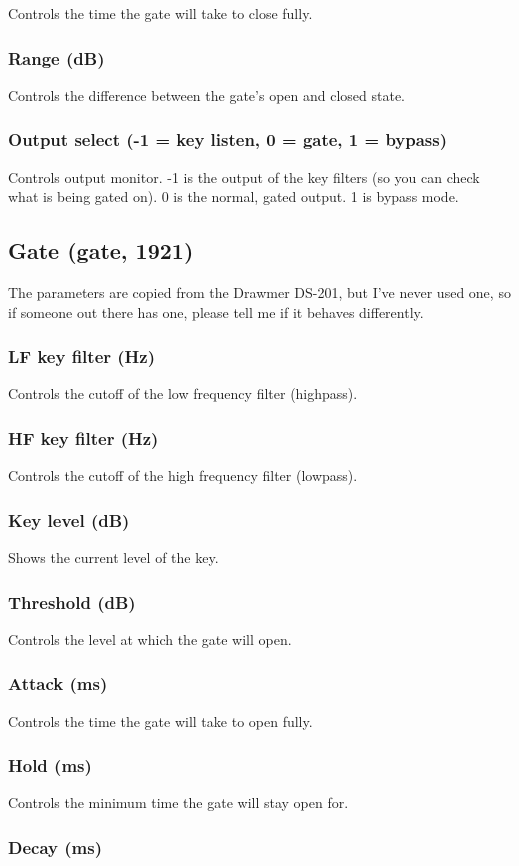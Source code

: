 \documentclass[11pt]{article}
\begin{document}
Controls the time the gate will take to close fully.\subsubsection*{Range (dB)}
Controls the difference between the gate's open and closed state.\subsubsection*{Output select (-1 = key listen, 0 = gate, 1 = bypass)}
Controls output monitor. -1 is the output of the key filters (so you can check what is being gated on). 0 is the normal, gated output. 1 is bypass mode.\subsection{Gate (gate, 1921)\label{gate}\label{id1921}}
The parameters are copied from the Drawmer DS-201, but I've never used one, so if someone out there has one, please tell me if it behaves differently.\subsubsection*{LF key filter (Hz)}
Controls the cutoff of the low frequency filter (highpass).\subsubsection*{HF key filter (Hz)}
Controls the cutoff of the high frequency filter (lowpass).\subsubsection*{Key level (dB)}
Shows the current level of the key.\subsubsection*{Threshold (dB)}
Controls the level at which the gate will open.\subsubsection*{Attack (ms)}
Controls the time the gate will take to open fully.\subsubsection*{Hold (ms)}
Controls the minimum time the gate will stay open for.\subsubsection*{Decay (ms)}
\end{document}
